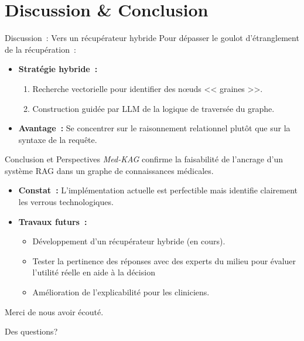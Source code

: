 \section{Discussion \& Conclusion}

\begin{frame}{Discussion~: Vers un récupérateur hybride}
  Pour dépasser le goulot d'étranglement de la récupération~:

  \medskip{}

  \pause[]

  \begin{itemize}
    \item<2-> \textbf{Stratégie hybride~:}
      \begin{enumerate}
        \item<3-> Recherche vectorielle pour identifier des n\oe{}uds
          << graines >>.
        \item<4-> Construction guidée par LLM de la logique de traversée du
          graphe.
      \end{enumerate}
    \item<5-> \textbf{Avantage~:} Se concentrer sur le raisonnement relationnel
      plutôt que sur la syntaxe de la requête.
  \end{itemize}
\end{frame}

\begin{frame}{Conclusion et Perspectives}
  \emph{Med-KAG} confirme la faisabilité de l'ancrage d'un système RAG dans un
  graphe de connaissances médicales.

  \medskip{}

  \pause[]

  \begin{itemize}
    \item<2-> \textbf{Constat~:} L'implémentation actuelle est perfectible
      mais identifie clairement les verrous technologiques.
    \item<3-> \textbf{Travaux futurs~:}
      \begin{itemize}
        \item<4-> Développement d'un récupérateur hybride (en cours).
        \item<5-> Tester la pertinence des réponses avec des experts du milieu
          pour évaluer l'utilité réelle en aide à la décision
        \item<6-> Amélioration de l'explicabilité pour les cliniciens.
      \end{itemize}
  \end{itemize}
\end{frame}

\begin{frame}[standout]
  Merci de nous avoir écouté.

  Des questions?
\end{frame}

